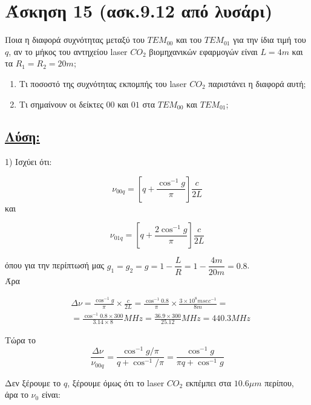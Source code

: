 \documentclass[a4paper,11pt,titlepage]{article}
\begin{document}
\section{Άσκηση 15 (ασκ.9.12 από λυσάρι)}

Ποια η διαφορά συχνότητας μεταξύ του $TEM_{00}$ και του $TEM_{01}$ για την ίδια τιμή του $q$, αν το μήκος του αντηχείου laser $CO_2$ βιομηχανικών εφαρμογών είναι $L=4m$ και τα $R_1=R_2=20m$;
\begin{enumerate}
 \item Τι ποσοστό της συχνότητας εκπομπής του laser $CO_2$ παριστάνει η διαφορά αυτή;
 \item Τι σημαίνουν οι δείκτες $00$ και $01$ στα $TEM_{00}$ και $TEM_{01}$;
\end{enumerate}

\subsection*{\underline{Λύση:}}

1) Ισχύει ότι:

\begin{equation}
 \nu_{00q}=[q+\frac{\cos^{-1}g}{\pi}]\frac{c}{2L}
\end{equation}
 και 

\begin{equation}
 \nu_{01q}=[q+\frac{2\cos^{-1}g}{\pi}]\frac{c}{2L}
\end{equation}

όπου για την περίπτωσή μας $g_1=g_2=g=1-\dfrac{L}{R}=1-\dfrac{4m}{20m}=0.8$.\\
Άρα

\begin{equation}
\begin{split}
& \Delta \nu=\frac{\cos^{-1}g}{\pi}\times\frac{c}{2L}=\frac{\cos^{-1}0.8}{\pi}\times\frac{3\times10^8msec^{-1}}{8m}= \\
& =\frac{\cos^{-1}0.8\times300}{3.14\times8}MHz=\frac{36.9\times300}{25.12}MHz=440.3MHz
\end{split}
\end{equation}

Τώρα το 
\begin{equation}
 \dfrac{\Delta \nu}{\nu_{00q}}=\dfrac{\cos^{-1}g/\pi}{q+\cos^{-1}/\pi}=\dfrac{\cos^{-1}g}{\pi q+\cos^{-1}g}
\end{equation}

Δεν ξέρουμε το $q$, ξέρουμε όμως ότι το laser $CO_2$ εκπέμπει στα $10.6\mu m$ περίπου, άρα το $\nu_0$ είναι:
\end{document}
